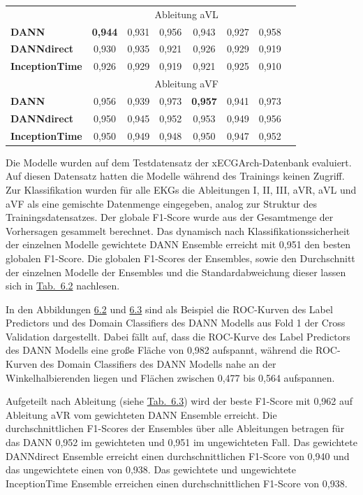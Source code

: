 \begin{table}[h!]
\begin{tabular}{lccccccc}
\midrule
					   & \multicolumn{6}{c}{{ Ableitung aVL}} \\ 
\cmidrule(lr){2-7}
\textbf{DANN} 			& \textbf{0,944}  & 0,931  & 0,956 & 0,943 & 0,927 & 0,958 \\
\textbf{DANNdirect}     & 0,930  & 0,935  & 0,921 & 0,926 & 0,929 & 0,919 \\
\textbf{InceptionTime}  & 0,926  & 0,929  & 0,919 & 0,921 & 0,925 & 0,910 \\
\midrule
					   & \multicolumn{6}{c}{{ Ableitung aVF}} \\ 
\cmidrule(lr){2-7}
\textbf{DANN} 			& 0,956  & 0,939  & 0,973  & \textbf{0,957} & 0,941 & 0,973 \\
\textbf{DANNdirect}     & 0,950  & 0,945  & 0,952  & 0,953 & 0,949 & 0,956 \\
\textbf{InceptionTime}  & 0,950  & 0,949  & 0,948  & 0,950 & 0,947 & 0,952\\
\bottomrule
\end{tabular}
\end{table}


Die Modelle wurden auf dem Testdatensatz der xECGArch-Datenbank evaluiert. Auf diesen Datensatz hatten die Modelle während des Trainings keinen Zugriff. Zur Klassifikation wurden für alle \gls{EKG}s die Ableitungen I, II, III, aVR, aVL und aVF als eine gemischte Datenmenge eingegeben, analog zur Struktur des Trainingsdatensatzes. Der globale F1-Score wurde aus der Gesamtmenge der Vorhersagen gesammelt berechnet. Das dynamisch nach Klassifikationssicherheit der einzelnen Modelle gewichtete \gls{DANN} Ensemble erreicht mit 0,951 den besten globalen F1-Score. Die globalen F1-Scores der Ensembles, sowie den Durchschnitt der einzelnen Modelle der Ensembles und die Standardabweichung dieser lassen sich in \hyperref[tab:Ergebnisse_indomain]{Tab.~6.2} nachlesen. 

In den Abbildungen \hyperref[fig:DANN_label_roc]{6.2} und \hyperref[fig:DANN_label_roc]{6.3} sind als Beispiel die \gls{ROC}-Kurven des Label Predictors und des Domain Classifiers des \gls{DANN} Modells aus Fold 1 der Cross Validation dargestellt. Dabei fällt auf, dass die ROC-Kurve des Label Predictors des \gls{DANN} Modells eine große Fläche von 0,982 aufspannt, während die ROC-Kurven des Domain Classifiers des \gls{DANN} Modells nahe an der Winkelhalbierenden liegen und Flächen zwischen 0,477 bis 0,564 aufspannen.

Aufgeteilt nach Ableitung (siehe \hyperref[tab:Ergebnisse_indomain_leads]{Tab.~6.3}) wird der beste F1-Score mit 0,962 auf Ableitung aVR vom gewichteten \gls{DANN} Ensemble erreicht. Die durchschnittlichen F1-Scores der Ensembles über alle Ableitungen betragen für das \gls{DANN} 0,952 im gewichteten und 0,951 im ungewichteten Fall. Das gewichtete DANNdirect Ensemble erreicht einen durchschnittlichen F1-Score von 0,940 und das ungewichtete einen von 0,938. Das gewichtete und ungewichtete InceptionTime Ensemble erreichen einen durchschnittlichen F1-Score von 0,938. 



